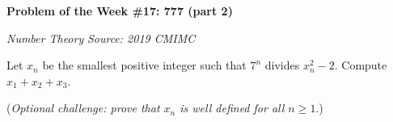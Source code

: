 \begin{potw}\vspace{5pt}
{\large\textbf{Problem of the Week \#17: 777 (part 2)}}\vspace{5pt}

\textit{Number Theory}\newline
\textit{Source: 2019 CMIMC}\V

Let $x_n$ be the smallest positive integer such that $7^n$ divides $x_n^2-2$. Compute $x_1+x_2+x_3$. \V

(\textit{Optional challenge: prove that $x_n$ is well defined for all $n\geq 1$}.)
\end{potw}\V
